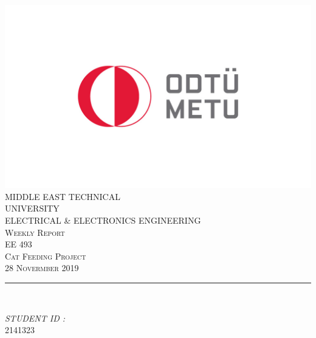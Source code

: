 \begin{titlepage}
	\centering
    \vspace*{0.5 cm}
    \includegraphics[scale = 1.5]{METU_Logo.jpg}\\[0.5 cm]	%
    \textsc{\Large MIDDLE EAST TECHNICAL} \\[0.2 cm]
    \textsc{\Large UNIVERSITY} \\ [1.0 cm]
    \textsc{\large ELECTRICAL \& ELECTRONICS ENGINEERING} \\[0.2 cm]
    \textsc{\large Weekly Report \weekNum}\\[0.2 cm]
	\textsc{\large EE 493}\\[0.5 cm]				%
	\textsc{\large Cat Feeding Project}\\[0.2 cm]
	\textsc{28 Novermber 2019}\\[0.2 cm]
	\rule{\linewidth}{0.2 mm} \\[0.2 cm]
	
	\begin{minipage}{0.4\textwidth}
		
			\begin{flushright} 
			\emph{STUDENT ID :} \\
			2141323\linebreak
		\end{flushright}
	\end{minipage}\\[2 cm]
	
	\vfill
	
\end{titlepage}
